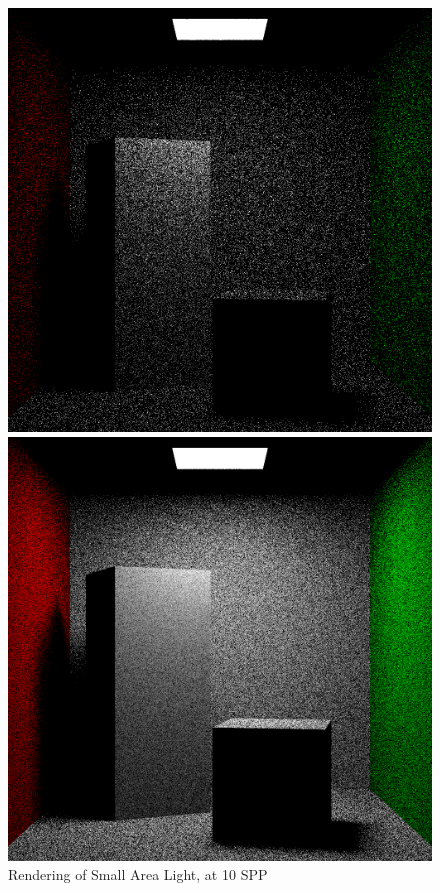 \documentclass[a4paper]{myarticle}
\begin{document}
\begin{figure}[H]
  \begin{minipage}[t]{.3\textwidth}
      \centering
      \includegraphics[width=\textwidth]{q3/small_0_10.png}
      \caption{Rendering of Small Area Light, at 10 SPP}
  \end{minipage}
  \hfill
  \begin{minipage}[t]{.3\textwidth}
      \centering
      \includegraphics[width=\textwidth]{q3/small_0_100.png}

\end{minipage}
\end{figure}
\end{document}
